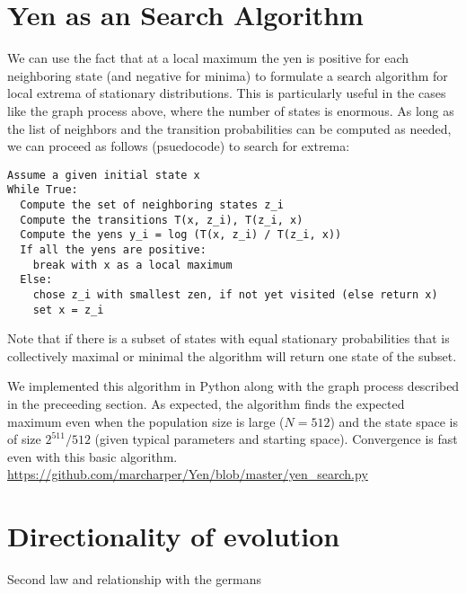 \documentclass[aps,prd,11pt,notitlepage,nofootinbib,superscriptaddress,showkeys,letterpaper]{revtex4-1}
\begin{document}
\section{Yen as an Search Algorithm}

We can use the fact that at a local maximum the yen is positive for each neighboring state
(and negative for minima) to formulate a search algorithm for local extrema of stationary
distributions. This is particularly useful in the cases like the graph process above,
where the number of states is enormous. As long as the list of neighbors and the transition
probabilities can be computed as needed, we can proceed as follows (psuedocode) to search
for extrema:

\begin{lstlisting}
Assume a given initial state x
While True:
  Compute the set of neighboring states z_i
  Compute the transitions T(x, z_i), T(z_i, x)
  Compute the yens y_i = log (T(x, z_i) / T(z_i, x))
  If all the yens are positive:
    break with x as a local maximum
  Else:
    chose z_i with smallest zen, if not yet visited (else return x)
    set x = z_i
\end{lstlisting}

Note that if there is a subset of states with equal stationary probabilities that is collectively maximal
or minimal the algorithm will return one state of the subset.

We implemented this algorithm in Python along with the graph process described in the preceeding section. As
expected, the algorithm finds the expected maximum even when the population size is large ($N=512$) and 
the state space is of size $2^511 / 512$ (given typical parameters and starting space). Convergence is fast
even with this basic algorithm. \url{https://github.com/marcharper/Yen/blob/master/yen_search.py}


\section{Directionality of evolution}\label{direction}

Second law and relationship with the germans




\maketitle




\end{document}
